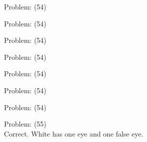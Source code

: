 \documentclass[11pt]{article}
\begin{document}
\begin{minipage}[t]{0.5\textwidth}
  {\centering
  
Problem: (54)\\
  }
\end{minipage}
\begin{minipage}[t]{0.5\textwidth}
  {\centering
  
Problem: (54)\\
  }
\end{minipage}
\begin{minipage}[t]{0.5\textwidth}
  {\centering
  
Problem: (54)\\
  }
\end{minipage}
\begin{minipage}[t]{0.5\textwidth}
  {\centering
  
Problem: (54)\\
  }
\end{minipage}
\begin{minipage}[t]{0.5\textwidth}
  {\centering
  
Problem: (54)\\
  }
\end{minipage}
\begin{minipage}[t]{0.5\textwidth}
  {\centering
  
Problem: (54)\\
  }
\end{minipage}
\begin{minipage}[t]{0.5\textwidth}
  {\centering
  
Problem: (54)\\
  }
\end{minipage}
\begin{minipage}[t]{0.5\textwidth}
  {\centering
  
Problem: (55)\\
Correct. White has one eye and one false eye.\\
  }
\end{minipage}
\end{document}
